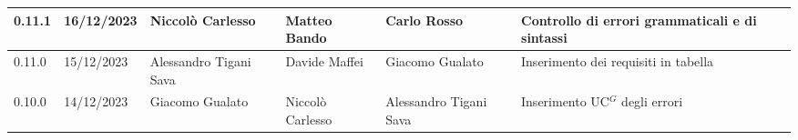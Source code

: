 \begin{table}[H]
\begin{tabularx}{\textwidth}{X|X|X|X|X|X}
		\hline
		0.11.1                & 16/12/2023           & Niccolò Carlesso       & Matteo Bando           & Carlo Rosso            & Controllo di errori grammaticali e di sintassi                                     \\
		\hline
		0.11.0                & 15/12/2023           & Alessandro Tigani Sava & Davide Maffei          & Giacomo Gualato        & Inserimento dei requisiti in tabella                                     \\
		\hline
		0.10.0                & 14/12/2023           & Giacomo Gualato        & Niccolò Carlesso       & Alessandro Tigani Sava & Inserimento \gls{UC}$^G$ degli errori                                     \\
		\bottomrule
	\end{tabularx}
\end{table}


